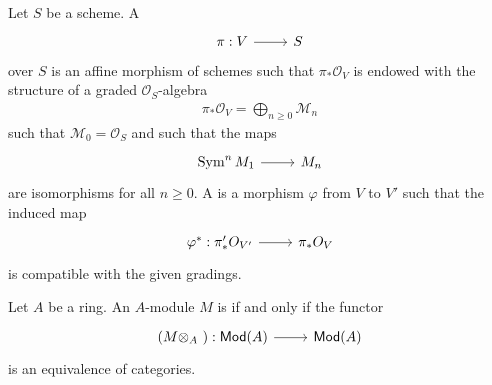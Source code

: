 \documentclass [11 pt, oneside] {article}
\begin{document}
\begin{definition}\label{}\text{}
Let $S$ be a scheme. A  
\[
\begin{tikzcd}
\pi:V\ar[r]&S
\end{tikzcd}
\] 
 over $S$ is an affine morphism of schemes such that $\pi_* \mathscr{O}_V$ is endowed with the structure of a graded $\mathscr{O}_S$-algebra 
\begin{align*}
	\pi_*\mathscr{O}_V = \bigoplus_{n\ge 0}\mathscr{M}_n
\end{align*}
such that $\mathscr{M}_0=\mathscr{O}_S$ and such that the maps
\[
\begin{tikzcd}
\Sym^n \mathscr{M}_1\ar[r]& \mathscr{M}_n
\end{tikzcd}
\] 
are isomorphisms for all $n\ge 0$. A   is a morphism $\varphi$ from $V$ to $V'$ such that the induced map
\[
\begin{tikzcd}
\varphi^* : \pi_*' \mathscr{O}_{V'}\ar[r]& \pi_*\mathscr{O}_V
\end{tikzcd}
\] 
is compatible with the given gradings.
\end{definition}

\begin{definition}\label{}\text{}
Let $A$ be a ring. An $A$-module $M$ is  if and only if the functor 
\[
\begin{tikzcd}
(M\tensor_A \ ) : \catn{Mod}(A) \ar[r]& \catn{Mod}(A)
\end{tikzcd}
\] 
is an equivalence of categories.
\end{definition}
\end{document}
